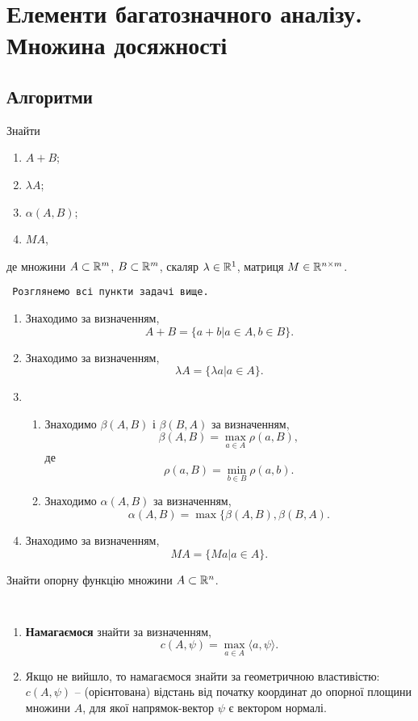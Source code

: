 
\section{Елементи багатозначного аналізу. Множина досяжності}

\subsection{Алгоритми}

\begin{problem*}
	Знайти
	\begin{enumerate}
		\item $A+B$;
		\item $\lambda A$;
		\item $\alpha(A,B)$;
		\item $MA$,
	\end{enumerate}
	де множини $A \subset\mathbb{R}^m$, $B\subset\mathbb{R}^m$, скаляр $\lambda\in\mathbb{R}^1$, матриця $M\in\mathbb{R}^{n\times m}$.
\end{problem*}

\begin{algorithm} \tt
	Розглянемо всі пункти задачі вище.
	\begin{enumerate}
		\item Знаходимо за визначенням, \[A+B=\{a+b|a\in A,b\in B\}.\]
		\item Знаходимо за визначенням, \[\lambda A =\{\lambda a|a\in A\}.\] 
		\item \begin{enumerate}
			\item Знаходимо $\beta(A,B)$ і $\beta(B,A)$ за визначенням, \[ \beta(A,B) = \max_{a\in A}\rho(a,B), \]
			де \[\rho(a,B) = \min_{b\in B} \rho(a,b).\]
			\item Знаходимо $\alpha(A,B)$ за визначенням, \[\alpha(A,B)=\max\{\beta(A,B),\beta(B,A).\]
		\end{enumerate} 
		\item Знаходимо за визначенням, \[MA=\{Ma|a\in A\}.\]
	\end{enumerate}
\end{algorithm}

\begin{problem*}
	Знайти опорну функцію множини $A \subset \mathbb{R}^n$.
\end{problem*}

\begin{algorithm} \tt
	\begin{enumerate}
		\item \textbf{Намагаємося} знайти за визначенням, \[ c(A,\psi) = \max_{a\in A} \langle a, \psi \rangle. \]
		\item Якщо не вийшло, то намагаємося знайти за геометричною властивістю: $c(A,\psi)$ -- (орієнтована) відстань від початку координат до опорної \allowbreak пло\-щи\-ни множини $A$, для якої напрямок-вектор $\psi$ є вектором нормалі.
	\end{enumerate}
\end{algorithm}

